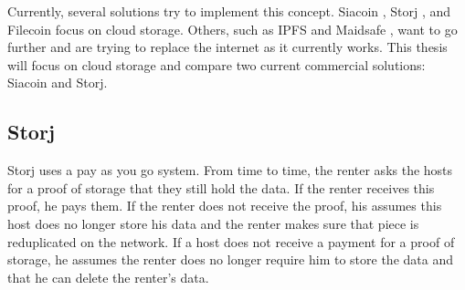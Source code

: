 Currently, several solutions try to implement this concept. Siacoin \cite{siacoin}, Storj \cite{storj}, and Filecoin \cite{filecoin} focus on cloud storage. Others, such as IPFS \cite{IPFS} and Maidsafe \cite{maidsafe}, want to go further and are trying to replace the internet as it currently works. This thesis will focus on cloud storage and compare two current commercial solutions: Siacoin and Storj.


\subsection{Storj}

\iffalse
# storj

- storj: uses a pay as you go system. every now and then you ask your storage providers for a proof that they are still holding your data. if you receive this proof, you pay them. If you do not receive a proof, you can assume this data is lost and make sure that piece of your date is reduplicated on the network. if a storage provider does not get paid for his proof, he can assume the user does not longer require him to store the data allowing him to delete this shard. 

- There are still some issues though: 
  - hosts take a risk when storing data, as they are never sure they will be paid. in the most extreme case, a malicious host might store a lot of data on the network, but never pay the first proof of storage, wasting this storage space. This effectively executes a denial of service attack on the network.
  - hosts do have no cost of not providing a proof of storage. 
  this makes the network very vulnerable to a sybil attack \ref{sybil-attack}. in which one malicious agent pretends to be several hosts at same time, at no cost. renters might think their data is secure, as it is duplicated over several hosts. However, the one malicious agent can turn off all his hosts, effectively destroying the stored data.


\fi


Storj uses a pay as you go system. From time to time, the renter asks the hosts for a proof of storage that they still hold the data. If the renter receives this proof, he pays them. If the renter does not receive the proof, his assumes this host does no longer store his data and the renter makes sure that piece is reduplicated on the network. If a host does not receive a payment for a proof of storage, he assumes the renter does no longer require him to store the data and that he can delete the renter's data. \cite{storj}

